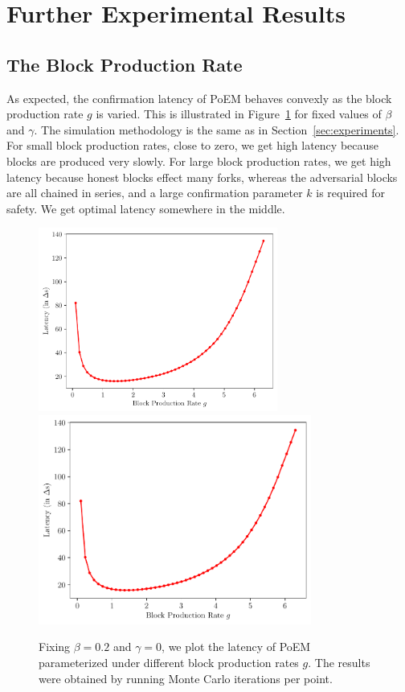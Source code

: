 \section{Further Experimental Results}\label{sec:more-experiments}

\subsection{The Block Production Rate}

As expected, the confirmation latency of PoEM behaves convexly as the block production rate $g$ is varied.
This is illustrated in Figure~\ref{fig:g_latency} for fixed values of $\beta$ and $\gamma$.
The simulation methodology is the same as in Section~\ref{sec:experiments}.
For small block production rates, close to zero, we get high latency because blocks are produced very slowly.
For large block production rates, we get high latency because honest blocks effect many forks, whereas the adversarial blocks
are all chained in series, and a large confirmation parameter $k$ is required for safety.
We get optimal latency somewhere in the middle.

\begin{figure}[pt]
  \centering
  \ifusenix
    \includegraphics[width = 0.7\textwidth]{figures/g_latency.pdf}
  \else
    \includegraphics[width = 0.8\textwidth]{figures/g_latency.pdf}
  \fi

  \caption{Fixing $\beta=0.2$ and $\gamma=0$, we plot the latency of PoEM parameterized under different block production rates $g$.
           The results were obtained by running \montecarlo{} Monte Carlo iterations per point.}
  \label{fig:g_latency}
\end{figure}

